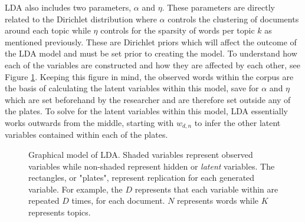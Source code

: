 \documentclass[a4paper, 12pt, twoside]{article}
\numberwithin{equation}{section} %
\begin{document}
LDA also includes two parameters, $\alpha$ and $\eta$. These parameters are directly related to the Dirichlet distribution where $\alpha$ controls the clustering of documents around each topic while $\eta$ controls for the sparsity of words per topic $k$ as mentioned previously. These are Dirichlet priors which will affect the outcome of the LDA model and must be set prior to creating the model. To understand how each of the variables are constructed and how they are affected by each other, see Figure \ref{dirichlet_notation}. Keeping this figure in mind, the observed words within the corpus are the basis of calculating the latent variables within this model, save for $\alpha$ and $\eta$ which are set beforehand by the researcher and are therefore set outside any of the plates. To solve for the latent variables within this model, LDA essentially works outwards from the middle, starting with $w_{d,n}$ to infer the other latent variables contained within each of the plates. 



\begin{figure}[h]
  \centering
  \caption[LDA graphical model]{Graphical model of LDA. Shaded variables represent observed variables while non-shaded represent hidden or \textit{latent} variables. The rectangles, or "plates", represent replication for each generated variable. For example, the $D$ represents that each variable within are repeated $D$ times, for each document. $N$ represents words while $K$ represents topics.}
\label{dirichlet_notation}
\end{figure}
\end{document}
